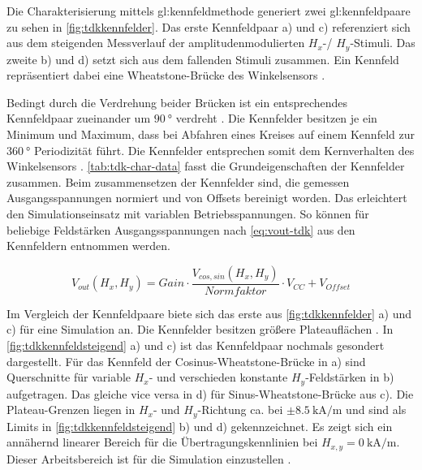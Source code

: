 Die Charakterisierung mittels \gls{gl:kennfeldmethode} generiert zwei \gls{gl:kennfeldpaar}e zu sehen in \autoref{fig:tdkkennfelder}. Das erste Kennfeldpaar a) und c) referenziert sich aus dem steigenden Messverlauf der amplitudenmodulierten $H_x$-/ $H_y$-Stimuli. Das zweite b) und d) setzt sich aus dem fallenden Stimuli zusammen. Ein Kennfeld repräsentiert dabei eine Wheatstone-Brücke des Winkelsensors \cite{Schuethe2019}. 


\clearpage


Bedingt durch die Verdrehung beider Brücken ist ein entsprechendes Kennfeldpaar zueinander um $\SI{90}{\degree}$ verdreht \cite{TDK2016}.
Die Kennfelder besitzen je ein Minimum und Maximum, dass bei Abfahren eines Kreises auf einem Kennfeld zur 
$\SI{360}{\degree}$ Periodizität führt. Die Kennfelder entsprechen somit dem Kernverhalten des Winkelsensors 
\cite{TDK2016}. \autoref{tab:tdk-char-data} fasst die Grundeigenschaften der Kennfelder zusammen. Beim zusammensetzen 
der Kennfelder sind, die gemessen Ausgangsspannungen normiert und von Offsets bereinigt worden. Das erleichtert den 
Simulationseinsatz mit variablen Betriebsspannungen. So können für beliebige Feldstärken Ausgangsspannungen nach 
\autoref{eq:vout-tdk} aus den Kennfeldern entnommen werden.


\vspace{5mm}
\begin{equation}\label{eq:vout-tdk}
	V_{out}(H_x,H_y) = Gain \cdot \frac{V_{cos,sin}(H_x,H_y)}{Normfaktor} \cdot V_{CC} + V_{Offset}
\end{equation}


\vspace{5mm}
Im Vergleich der Kennfeldpaare biete sich das erste aus \autoref{fig:tdkkennfelder} a) und c) für eine Simulation 
an. Die Kennfelder besitzen größere Plateauflächen \cite{Schuethe2019}. In \autoref{fig:tdkkennfeldsteigend} a) und c) 
ist das Kennfeldpaar nochmals gesondert dargestellt. Für das Kennfeld der Cosinus-Wheatstone-Brücke in a) sind 
Querschnitte für variable $H_x$- und verschieden konstante $H_y$-Feldstärken in b) aufgetragen. Das gleiche vice versa 
in d) für Sinus-Wheatstone-Brücke aus c). Die Plateau-Grenzen liegen in $H_x$- und $H_y$-Richtung ca. bei 
$\pm\SI{8,5}{\kilo\ampere\per\metre}$ und sind als Limits in \autoref{fig:tdkkennfeldsteigend} b) und d) 
gekennzeichnet. Es zeigt sich ein annähernd linearer Bereich für die Übertragungskennlinien bei $H_{x,y} 
= \SI{0}{\kilo\ampere\per\metre}$. Dieser Arbeitsbereich ist für die Simulation einzustellen \cite{Schuethe2019}.


